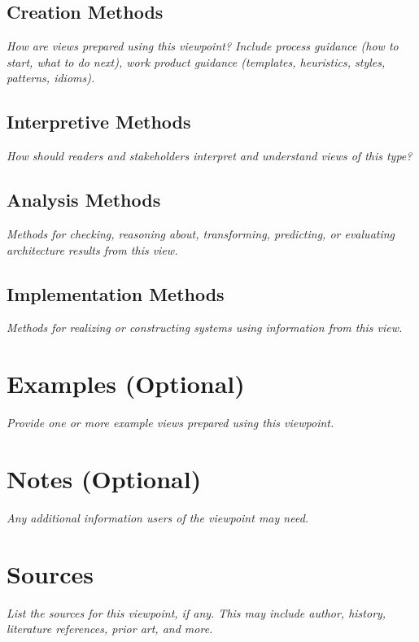 \documentclass[11pt]{article}
\begin{document}
\subsection*{Creation Methods}
\textit{How are views prepared using this viewpoint? Include process guidance
(how to start, what to do next), work product guidance (templates, heuristics,
styles, patterns, idioms).}

\vspace{4em}

\subsection*{Interpretive Methods}
\textit{How should readers and stakeholders interpret and understand views of
this type?}

\vspace{4em}

\subsection*{Analysis Methods}
\textit{Methods for checking, reasoning about, transforming, predicting, or
evaluating architecture results from this view.}

\vspace{4em}

\subsection*{Implementation Methods}
\textit{Methods for realizing or constructing systems using information from
this view.}

\vspace{4em}

\section*{Examples (Optional)}
\textit{Provide one or more example views prepared using this viewpoint.}

\vspace{8em}

\section*{Notes (Optional)}
\textit{Any additional information users of the viewpoint may need.}

\vspace{6em}

\section*{Sources}
\textit{List the sources for this viewpoint, if any. This may include author,
history, literature references, prior art, and more.}

\vspace{6em}
\end{document}
